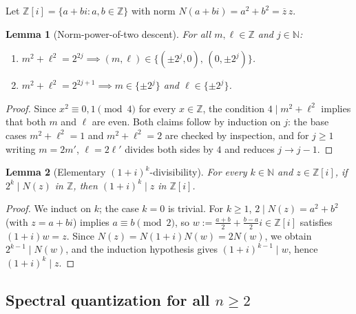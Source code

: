 \documentclass[11pt,a4paper]{article}
\theoremstyle{plain}
\newtheorem{lemma}{Lemma}[section]
\theoremstyle{definition}
\theoremstyle{remark}
\newcommand{\Z}{\mathbb{Z}}
\newcommand{\N}{\mathbb{N}}
\newcommand{\Zi}{\mathbb{Z}[i]}
\numberwithin{equation}{section}
\begin{document}
Let $\Zi = \{a + bi : a, b \in \Z\}$ with norm $N(a + bi) = a^2 + b^2 = \overline{z}\,z$.

\begin{lemma}[Norm-power-of-two descent]\label{lem:sq-descent}
For all $m, \ell \in \Z$ and $j \in \N$:
\begin{enumerate}[label=(\roman*),leftmargin=2em]
  \item $m^2 + \ell^2 = 2^{2j} \implies (m, \ell) \in \{(\pm 2^j, 0),\, (0, \pm 2^j)\}$.
  \item $m^2 + \ell^2 = 2^{2j+1} \implies m \in \{\pm 2^j\}$ and $\ell \in \{\pm 2^j\}$.
\end{enumerate}
\end{lemma}

\begin{proof}
Since $x^2 \equiv 0, 1 \pmod{4}$ for every $x \in \Z$, the condition $4 \mid m^2 + \ell^2$ implies that both $m$ and $\ell$ are even. Both claims follow by induction on $j$: the base cases $m^2 + \ell^2 = 1$ and $m^2 + \ell^2 = 2$ are checked by inspection, and for $j \ge 1$ writing $m = 2m'$, $\ell = 2\ell'$ divides both sides by $4$ and reduces $j \to j - 1$.
\end{proof}

\begin{lemma}[Elementary $(1+i)^k$-divisibility]\label{lem:gi-pi-descent}
For every $k \in \N$ and $z \in \Zi$, if $2^k \mid N(z)$ in $\Z$, then $(1+i)^k \mid z$ in $\Zi$.
\end{lemma}

\begin{proof}
We induct on $k$; the case $k = 0$ is trivial. For $k \ge 1$, $2 \mid N(z) = a^2 + b^2$ (with $z = a + bi$) implies $a \equiv b \pmod{2}$, so $w := \frac{a+b}{2} + \frac{b-a}{2} i \in \Zi$ satisfies $(1+i)w = z$. Since $N(z) = N(1+i)N(w) = 2 N(w)$, we obtain $2^{k-1} \mid N(w)$, and the induction hypothesis gives $(1+i)^{k-1} \mid w$, hence $(1+i)^k \mid z$.
\end{proof}

\subsection{Spectral quantization for all \texorpdfstring{$n \ge 2$}{n >= 2}}\label{sec:quant}
\end{document}
